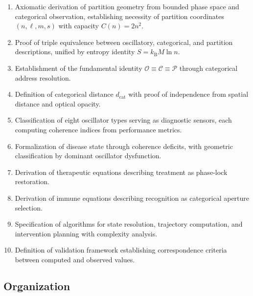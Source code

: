 \documentclass[10pt,twocolumn]{article}
\theoremstyle{plain}
\theoremstyle{definition}
\theoremstyle{remark}
\newcommand{\kB}{k_{\mathrm{B}}}
\newcommand{\dcat}{d_{\mathrm{cat}}}
\newcommand{\Obs}{\mathcal{O}}
\newcommand{\Comp}{\mathcal{C}}
\newcommand{\Proc}{\mathcal{P}}
\begin{document}
\begin{enumerate}[label=(\arabic*), leftmargin=*]
\item Axiomatic derivation of partition geometry from bounded phase space and categorical observation, establishing necessity of partition coordinates $(n, \ell, m, s)$ with capacity $C(n) = 2n^2$.

\item Proof of triple equivalence between oscillatory, categorical, and partition descriptions, unified by entropy identity $S = \kB M \ln n$.

\item Establishment of the fundamental identity $\Obs \equiv \Comp \equiv \Proc$ through categorical address resolution.

\item Definition of categorical distance $\dcat$ with proof of independence from spatial distance and optical opacity.

\item Classification of eight oscillator types serving as diagnostic sensors, each computing coherence indices from performance metrics.

\item Formalization of disease state through coherence deficits, with geometric classification by dominant oscillator dysfunction.

\item Derivation of therapeutic equations describing treatment as phase-lock restoration.

\item Derivation of immune equations describing recognition as categorical aperture selection.

\item Specification of algorithms for state resolution, trajectory computation, and intervention planning with complexity analysis.

\item Definition of validation framework establishing correspondence criteria between computed and observed values.
\end{enumerate}

\subsection{Organization}
\end{document}
